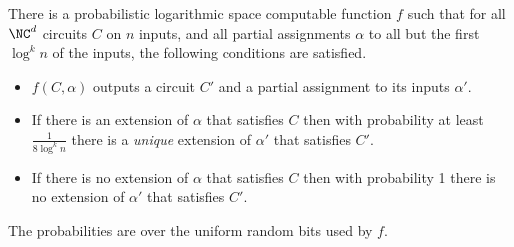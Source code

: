 \documentclass{article}
\begin{document}
\begin{theorem}
  There is a probabilistic logarithmic space computable function $f$ such that for all $\NC^d$ circuits $C$ on $n$ inputs, and all partial assignments $\alpha$ to all but the first $\log^k n$ of the inputs, the following conditions are satisfied.
  \begin{itemize}
  \item $f(C, \alpha)$ outputs a circuit $C'$ and a partial assignment to its inputs $\alpha'$.
  \item If there is an extension of $\alpha$ that satisfies $C$ then with probability at least $\frac{1}{8 \log^k n}$ there is a \emph{unique} extension of $\alpha'$ that satisfies $C'$.
  \item If there is no extension of $\alpha$ that satisfies $C$ then with probability 1 there is no extension of $\alpha'$ that satisfies $C'$.
  \end{itemize}
  The probabilities are over the uniform random bits used by $f$.
\end{theorem}
\end{document}
